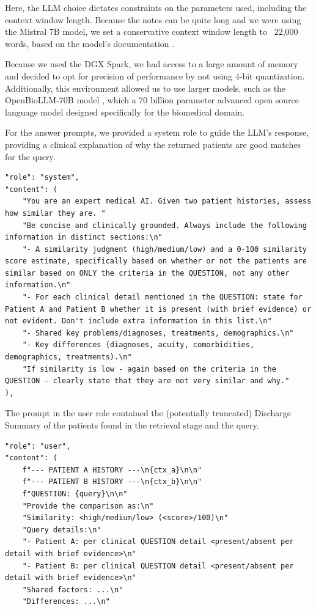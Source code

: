 \documentclass[acmtog]{acmart}
\begin{document}
Here, the LLM choice dictates constraints on the parameters used, including the context window length. Because the notes can be quite long and we were using the Mistral 7B model, we set a conservative context window length to ~22{,}000 words, based on the model's documentation \cite{obot_mistral7b_instruct}.

Because we used the DGX Spark, we had access to a large amount of memory and decided to opt for precision of performance by not using 4-bit quantization. Additionally, this environment allowed us to use larger models, such as the OpenBioLLM-70B model \cite{hf_llama3_openbiollm_70b}, which a 70 billion parameter advanced open source language model designed specifically for the biomedical domain.

For the answer prompts, we provided a system role to guide the LLM's response, providing a clinical explanation of why the returned patients are good matches for the query.

\begin{lstlisting}
"role": "system",
"content": (
    "You are an expert medical AI. Given two patient histories, assess how similar they are. "
    "Be concise and clinically grounded. Always include the following information in distinct sections:\n"
    "- A similarity judgment (high/medium/low) and a 0-100 similarity score estimate, specifically based on whether or not the patients are similar based on ONLY the criteria in the QUESTION, not any other information.\n"
    "- For each clinical detail mentioned in the QUESTION: state for Patient A and Patient B whether it is present (with brief evidence) or not evident. Don't include extra information in this list.\n"
    "- Shared key problems/diagnoses, treatments, demographics.\n"
    "- Key differences (diagnoses, acuity, comorbidities, demographics, treatments).\n"
    "If similarity is low - again based on the criteria in the QUESTION - clearly state that they are not very similar and why."
),
\end{lstlisting}

The prompt in the user role contained the (potentially truncated) Discharge Summary of the patients found in the retrieval stage and the query.

\begin{lstlisting}
"role": "user",
"content": (
    f"--- PATIENT A HISTORY ---\n{ctx_a}\n\n"
    f"--- PATIENT B HISTORY ---\n{ctx_b}\n\n"
    f"QUESTION: {query}\n\n"
    "Provide the comparison as:\n"
    "Similarity: <high/medium/low> (<score>/100)\n"
    "Query details:\n"
    "- Patient A: per clinical QUESTION detail <present/absent per detail with brief evidence>\n"
    "- Patient B: per clinical QUESTION detail <present/absent per detail with brief evidence>\n"
    "Shared factors: ...\n"
    "Differences: ...\n"
\end{lstlisting}
\end{document}
